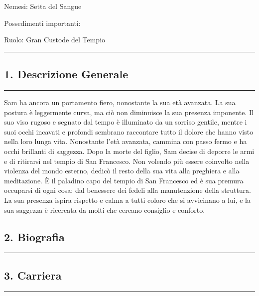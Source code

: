 Nemesi: Setta del Sangue

Possedimenti importanti:

Ruolo: Gran Custode del Tempio

\begin{center}\rule{0.5\linewidth}{0.5pt}\end{center}

\subsection{1. Descrizione Generale}\label{descrizione-generale}

\begin{center}\rule{0.5\linewidth}{0.5pt}\end{center}

Sam ha ancora un portamento fiero, nonostante la sua età avanzata. La
sua postura è leggermente curva, ma ciò non diminuisce la sua presenza
imponente. Il suo viso rugoso e segnato dal tempo è illuminato da un
sorriso gentile, mentre i suoi occhi incavati e profondi sembrano
raccontare tutto il dolore che hanno visto nella loro lunga vita.
Nonostante l'età avanzata, cammina con passo fermo e ha occhi brillanti
di saggezza. Dopo la morte del figlio, Sam decise di deporre le armi e
di ritirarsi nel tempio di San Francesco. Non volendo più essere
coinvolto nella violenza del mondo esterno, dedicò il resto della sua
vita alla preghiera e alla meditazione. È il paladino capo del tempio di
San Francesco ed è sua premura occuparsi di ogni cosa: dal benessere dei
fedeli alla manutenzione della struttura. La sua presenza ispira
rispetto e calma a tutti coloro che si avvicinano a lui, e la sua
saggezza è ricercata da molti che cercano consiglio e conforto.

\subsection{2. Biografia}\label{biografia}

\begin{center}\rule{0.5\linewidth}{0.5pt}\end{center}

\subsection{3. Carriera}\label{carriera}

\begin{center}\rule{0.5\linewidth}{0.5pt}\end{center}

